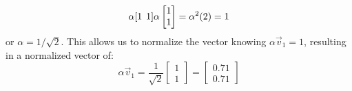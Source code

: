 \documentclass[12pt,letter]{article}
\begin{document}
\begin{example}
\begin{equation}
\alpha [1 \hspace{1ex} 1]\alpha  \begin{bmatrix} 1 \\  1 \end{bmatrix}  = \alpha^2(2) = 1
\end{equation}
or $\alpha = 1/\sqrt{2}$. This allows us to normalize the vector knowing $\alpha \vec{v}_1=1$, resulting in a normalized vector of:
\begin{equation}
\alpha \vec{v}_1=  \frac{1}{\sqrt{2}} \begin{bmatrix} 1 \\ 1 \end{bmatrix}  =  \begin{bmatrix} 0.71 \\ 0.71 \end{bmatrix} 
\end{equation} 


\end{example}
\end{document}
